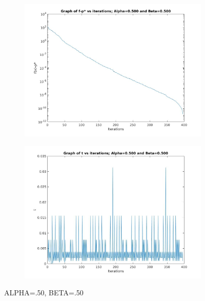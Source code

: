 \documentclass[12pt]{article}
\begin{document}
\begin{figure}[ht]
    \centering
    \begin{subfigure}{0.4\textwidth} %
        \includegraphics[width=\textwidth]{f_alpha_50_beta_50.jpg}
    \end{subfigure}
    \vspace{1em} %
    \begin{subfigure}{0.4\textwidth} %
        \includegraphics[width=\textwidth]{t_alpha_50_beta_50.jpg}
    \end{subfigure}
    \caption{ALPHA=.50, BETA=.50} %
\end{figure}
\end{document}
